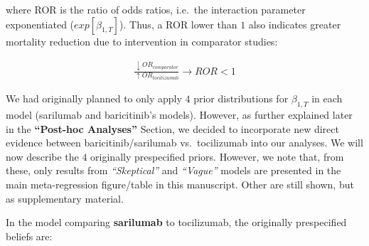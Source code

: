 \documentclass[
  12pt,
]{article}
\begin{document}
where ROR is the ratio of odds ratios, i.e.~the interaction parameter
exponentiated (\(exp[\beta_{1, T}]\)). Thus, a ROR lower than \(1\) also
indicates greater mortality reduction due to intervention in comparator
studies:

\begin{align*}
\frac {\downarrow OR_{comparator}}{\uparrow OR_{tocilizumab}} \rightarrow ROR < 1
\end{align*}

We had originally planned to only apply \(4\) prior distributions for
\(\beta_{1, T}\) in each model (sarilumab and baricitinib's models).
However, as further explained later in the \textbf{``Post-hoc
Analyses''} Section, we decided to incorporate new direct evidence
between baricitinib/sarilumab vs.~tocilizumab into our analyses. We will
now describe the \(4\) originally prespecified priors. However, we note
that, from these, only results from \emph{``Skeptical''} and
\emph{``Vague''} models are presented in the main meta-regression
figure/table in this manuscript. Other are still shown, but as
supplementary material.

In the model comparing \textbf{sarilumab} to tocilizumab, the originally
prespecified beliefs are:
\end{document}
